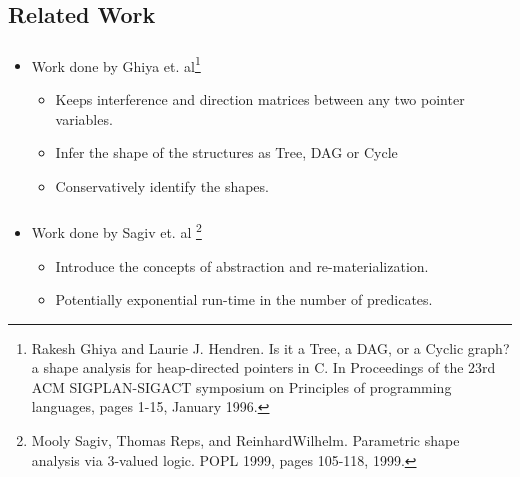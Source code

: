 \documentclass[mathserif,10pt]{beamer}
\newcommand{\cmt}[1]{}
\begin{document}
\subsection{Related Work}
\frame
{
	\frametitle{\subsecname}
	\begin{itemize}
	\item Work done by Ghiya et. al\footnote{Rakesh Ghiya and Laurie J. Hendren. Is it a Tree, a DAG, or a Cyclic graph? 
	a shape analysis for heap-directed pointers in C. In Proceedings of the 23rd ACM
	SIGPLAN-SIGACT symposium on Principles of programming languages, pages 1-15, January 1996.}
	
	\begin{itemize}
	\item Keeps interference and direction matrices between any two 
			pointer variables.
	\item Infer the shape of the structures as Tree, DAG or Cycle
	\item Conservatively identify the shapes.
	\end{itemize}
	\end{itemize}
}
\frame
{
	\frametitle{\subsecname}
	\begin{itemize}
	\item Work done by Sagiv et. al \footnote{Mooly Sagiv, Thomas Reps, and ReinhardWilhelm. Parametric shape analysis via
	3-valued logic. POPL 1999, pages 105-118, 1999.}
	
	\begin{itemize}
	\item Introduce the concepts of abstraction and re-materialization.
	\item Potentially exponential run-time in the number of predicates.
	\end{itemize}
	\end{itemize}
		
}
\cmt{
\frame
{
	\frametitle{\subsecname}
	\begin{itemize}
	\item Work done by Marron et. al \footnote{Mark Marron, Deepak Kapur, Darko Stefanovic, and Manuel Hermenegildo. A
static heap analysis for shape and connectivity: unified memory analysis: the base
framework. LCPC'06, pages 345-363, 2006.}
	
	\begin{itemize}
	\item Presents a data flow framework that uses heap graphs to model data flow values.
	\item The analysis uses technique similar to re-materialization, but the re-materialization is approximate and 
	may result in loss of precision.
	\end{itemize}
	\end{itemize}
		
}
}
\end{document}
